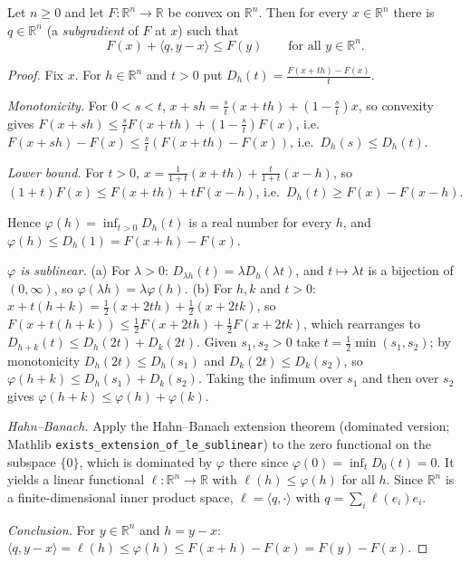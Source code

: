 \begin{lemma}
Let $n\ge0$ and let $F:\mathbb R^n\to\mathbb R$ be convex on $\mathbb R^n$. Then for every $x\in\mathbb R^n$ there is $q\in\mathbb R^n$ (a \emph{subgradient} of $F$ at $x$) such that
\[
F(x)+\langle q,y-x\rangle\le F(y)\qquad\text{for all }y\in\mathbb R^n.
\]
\end{lemma}
\begin{proof}
Fix $x$. For $h\in\mathbb R^n$ and $t>0$ put $D_h(t)=\frac{F(x+th)-F(x)}{t}$.

\emph{Monotonicity.} For $0<s<t$, $x+sh=\frac st(x+th)+(1-\frac st)x$, so convexity gives $F(x+sh)\le\frac stF(x+th)+(1-\frac st)F(x)$, i.e.\ $F(x+sh)-F(x)\le\frac st(F(x+th)-F(x))$, i.e.\ $D_h(s)\le D_h(t)$.

\emph{Lower bound.} For $t>0$, $x=\frac1{1+t}(x+th)+\frac t{1+t}(x-h)$, so $(1+t)F(x)\le F(x+th)+tF(x-h)$, i.e.\ $D_h(t)\ge F(x)-F(x-h)$.

Hence $\varphi(h)=\inf_{t>0}D_h(t)$ is a real number for every $h$, and $\varphi(h)\le D_h(1)=F(x+h)-F(x)$.

\emph{$\varphi$ is sublinear.} (a) For $\lambda>0$: $D_{\lambda h}(t)=\lambda D_h(\lambda t)$, and $t\mapsto\lambda t$ is a bijection of $(0,\infty)$, so $\varphi(\lambda h)=\lambda\varphi(h)$. (b) For $h,k$ and $t>0$: $x+t(h+k)=\frac12(x+2th)+\frac12(x+2tk)$, so $F(x+t(h+k))\le\frac12F(x+2th)+\frac12F(x+2tk)$, which rearranges to $D_{h+k}(t)\le D_h(2t)+D_k(2t)$. Given $s_1,s_2>0$ take $t=\frac12\min(s_1,s_2)$; by monotonicity $D_h(2t)\le D_h(s_1)$ and $D_k(2t)\le D_k(s_2)$, so $\varphi(h+k)\le D_h(s_1)+D_k(s_2)$. Taking the infimum over $s_1$ and then over $s_2$ gives $\varphi(h+k)\le\varphi(h)+\varphi(k)$.

\emph{Hahn--Banach.} Apply the Hahn--Banach extension theorem (dominated version; Mathlib \texttt{exists\_extension\_of\_le\_sublinear}) to the zero functional on the subspace $\{0\}$, which is dominated by $\varphi$ there since $\varphi(0)=\inf_tD_0(t)=0$. It yields a linear functional $\ell:\mathbb R^n\to\mathbb R$ with $\ell(h)\le\varphi(h)$ for all $h$. Since $\mathbb R^n$ is a finite-dimensional inner product space, $\ell=\langle q,\cdot\rangle$ with $q=\sum_i\ell(e_i)e_i$.

\emph{Conclusion.} For $y\in\mathbb R^n$ and $h=y-x$: $\langle q,y-x\rangle=\ell(h)\le\varphi(h)\le F(x+h)-F(x)=F(y)-F(x)$.
\end{proof}
